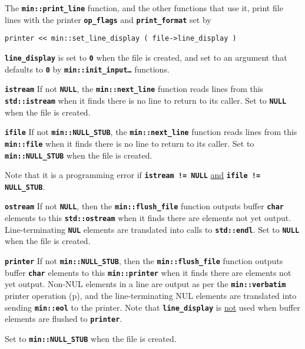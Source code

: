 \documentclass[12pt]{article}
\makeatletter
\newcommand{\TT}[1]{{\tt \bfseries #1}}
\newcommand{\ttmkey}[2]{\TT{#1}\index{#1@{\tt #1}!#2}}
\newcommand{\pagref}[1]{p\pageref{#1}}
\newcommand{\EOL}{\penalty \exhyphenpenalty}
\newenvironment{itemlist}[1][1.2in]%
	{\begin{list}{}{\setlength{\labelwidth}{#1}%
		        \setlength{\leftmargin}{\labelwidth}%
		        \addtolength{\leftmargin}{+0.2in}%
		        \renewcommand{\makelabel}[1]{##1\hfill}}}%
	{\end{list}}
\makeatother
\begin{document}
\begin{itemlist}[1.4in]
The \TT{min::print\_line} function, and the other functions that use
it, print file lines with the printer \TT{op\_flags} and \TT{print\_\EOL format}
set by
\begin{center}
\tt printer <{}< min::set\_line\_display ( file->line\_display )
\end{center}

\TT{line\_display} is set
to \TT{0} when the file is created, and set to an argument
that defaults to \TT{0}
by \TT{min::\EOL init\_\EOL input\ldots} functions.

\item[\ttmkey{istream}{in {\tt min::file}}]
If not \TT{NULL}, the \TT{min::\EOL next\_\EOL line} function
reads lines from this \TT{std::\EOL istream} when it finds
there is no line to return to its caller.
Set to \TT{NULL} when the file is created.

\item[\ttmkey{ifile}{in {\tt min::file}}]
If not \TT{min::NULL\_STUB}, the \TT{min::\EOL next\_\EOL line} function
reads lines from this \TT{min::\EOL file} when it finds
there is no line to return to its caller.
Set to \TT{min::\EOL NULL\_\EOL STUB} when the file is created.

Note that it is a programming error if \TT{istream != NULL}
\underline{and} \TT{ifile != NULL\_\EOL STUB}.

\item[\ttmkey{ostream}{in {\tt min::file}}]\label{OSTREAM_OF_FILE}
If not \TT{NULL}, then the \TT{min::\EOL flush\_\EOL file} function
outputs buffer \TT{char} elements to this \TT{std::\EOL ostream} when it finds
there are elements not yet output.
Line-terminating \TT{NUL} elements are translated into calls to
\TT{std::\EOL endl}.
Set to \TT{NULL} when the file is created.

\item[\ttmkey{printer}{in {\tt min::file}}]\label{PRINTER_OF_FILE}
If not \TT{min::NULL\_STUB}, then the \TT{min::\EOL flush\_\EOL file} function
outputs buffer \TT{char} elements
to this \TT{min::\EOL printer} when it finds
there are elements not yet output.
Non-NUL elements in a
line are output as per the \TT{min::\EOL verbatim}
printer operation (\pagref{MIN::VERBATIM}),
and the line-terminating
NUL elements are translated into sending \TT{min::eol} to the printer.
Note that \TT{line\_\EOL display} is \underline{not} used
when buffer elements are flushed to \TT{printer}.

Set to \TT{min::\EOL NULL\_\EOL STUB} when the file is created.


\end{itemlist}
\end{document}
